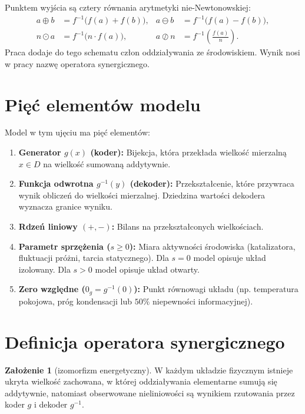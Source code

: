 \documentclass[11pt,a4paper]{article}
\theoremstyle{definition}
\newtheorem{axiom}{Założenie}[section]
\theoremstyle{plain}
\begin{document}
Punktem wyjścia są cztery równania arytmetyki nie-Newtonowskiej:
\begin{align}
    a \oplus b &= f^{-1}\big(f(a) + f(b)\big), & a \ominus b &= f^{-1}\big(f(a) - f(b)\big), \\
    n \odot a &= f^{-1}\big(n \cdot f(a)\big), & a \oslash n &= f^{-1}\left(\frac{f(a)}{n}\right).
\end{align}
Praca dodaje do tego schematu człon oddziaływania ze środowiskiem. Wynik nosi w pracy nazwę operatora synergicznego.

\section{Pięć elementów modelu}

Model w tym ujęciu ma pięć elementów:

\begin{enumerate}
    \item \textbf{Generator $g(x)$ (koder):} Bijekcja, która przekłada wielkość mierzalną $x \in D$ na wielkość sumowaną addytywnie.
    \item \textbf{Funkcja odwrotna $g^{-1}(y)$ (dekoder):} Przekształcenie, które przywraca wynik obliczeń do wielkości mierzalnej. Dziedzina wartości dekodera wyznacza granice wyniku.
    \item \textbf{Rdzeń liniowy $(+, -)$:} Bilans na przekształconych wielkościach.
    \item \textbf{Parametr sprzężenia ($s \ge 0$):} Miara aktywności środowiska (katalizatora, fluktuacji próżni, tarcia statycznego). Dla $s = 0$ model opisuje układ izolowany. Dla $s > 0$ model opisuje układ otwarty.
    \item \textbf{Zero względne ($0_g = g^{-1}(0)$):} Punkt równowagi układu (np. temperatura pokojowa, próg kondensacji lub $50\%$ niepewności informacyjnej).
\end{enumerate}

\section{Definicja operatora synergicznego}

\begin{axiom}[izomorfizm energetyczny]
W każdym układzie fizycznym istnieje ukryta wielkość zachowana, w której oddziaływania elementarne sumują się addytywnie, natomiast obserwowane nieliniowości są wynikiem rzutowania przez koder $g$ i dekoder $g^{-1}$.
\end{axiom}
\end{document}
